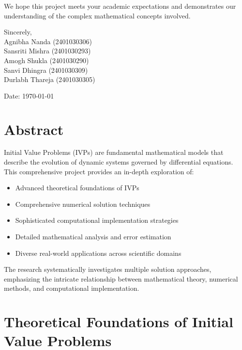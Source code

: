 \documentclass[12pt,a4paper]{article}
\begin{document}
\vspace{1em}

\noindent
We hope this project meets your academic expectations and demonstrates our understanding of the complex mathematical concepts involved.

\vspace{2em}

\noindent
Sincerely, \\[2em]

\noindent
    Agnibha Nanda (2401030306) \\
    Sansriti Mishra (2401030293) \\
    Amogh Shukla (2401030290) \\
    Sanvi Dhingra (2401030309) \\
    Durlabh Thareja (2401030305) \\

\vspace{2cm}

\noindent
Date: \today

\newpage

\tableofcontents

\newpage

\section{Abstract}
Initial Value Problems (IVPs) are fundamental mathematical models that describe the evolution of dynamic systems governed by differential equations. This comprehensive project provides an in-depth exploration of:

\begin{itemize}
    \item Advanced theoretical foundations of IVPs
    \item Comprehensive numerical solution techniques
    \item Sophisticated computational implementation strategies
    \item Detailed mathematical analysis and error estimation
    \item Diverse real-world applications across scientific domains
\end{itemize}

The research systematically investigates multiple solution approaches, emphasizing the intricate relationship between mathematical theory, numerical methods, and computational implementation.

\section{Theoretical Foundations of Initial Value Problems}
\end{document}
